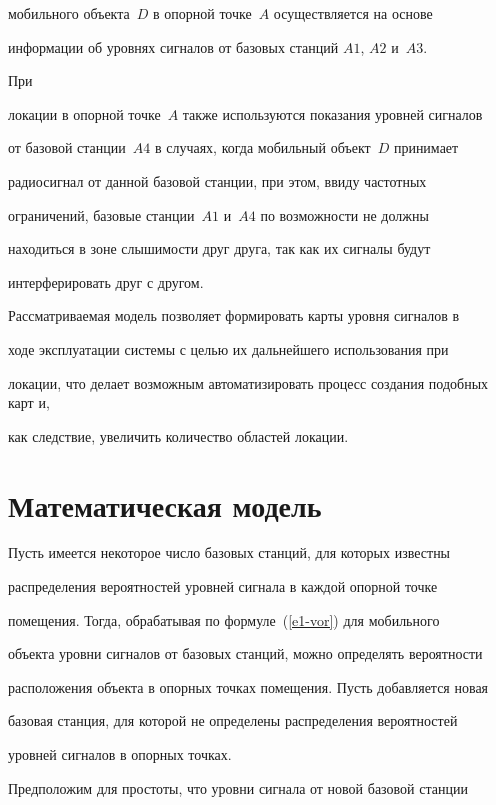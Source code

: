 мобильного объекта~$D$ в опорной точке~$A$ осуществляется на основе

информации об уровнях сигналов от базовых станций $A1$, $A2$ и~$A3$. 



При

локации в опорной точке~$A$ также используются показания уровней сигналов

от базовой станции~$A4$ в случаях, когда мобильный объект~$D$ принимает

радиосигнал от данной базовой станции, при этом, ввиду частотных

ограничений, базовые станции~$A1$ и~$A4$ по возможности не должны

находиться в зоне слышимости друг друга, так как их сигналы будут

интерферировать друг с другом.





 Рассматриваемая модель позволяет формировать карты уровня сигналов в

ходе эксплуатации системы с целью их дальнейшего использования при

локации, что делает возможным автоматизировать процесс создания подобных карт и,

как следствие, увеличить количество областей локации.



\section{Математическая модель}



 Пусть имеется некоторое число базовых станций, для которых известны

распределения вероятностей уровней сигнала в каждой опорной точке

помещения. Тогда, обрабатывая по формуле~(\ref{e1-vor}) для мобильного

объекта уровни сигналов от базовых станций, можно определять вероятности

расположения объекта в опорных точках помещения. Пусть добавляется новая

базовая станция, для которой не определены распределения вероятностей

уровней сигналов в опорных точках.



 Предположим для простоты, что уровни сигнала от новой базовой станции

